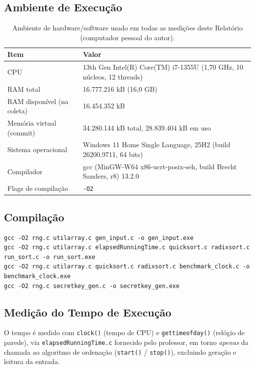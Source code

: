 \documentclass[11pt,a4paper]{article}
\renewcommand{\_}{\underscoreoriginal\allowbreak}
\begin{document}
\subsection{Ambiente de Execução}
\label{sec:ambiente}

\begin{table}[H]
\centering
\caption{Ambiente de hardware/software usado em todas as medições deste Relatório (computador pessoal do autor).}
{\small
\begin{tabular}{L{4.0cm} L{10.5cm}}
\toprule
{}
Item & Valor\\
\midrule
CPU & 13th Gen Intel(R) Core(TM) i7-1355U (1,70 GHz, 10 núcleos, 12 threads)\\
RAM total & 16.777.216 kB (16,0 GB)\\
RAM disponível (na coleta) & 16.454.352 kB\\
Memória virtual (commit) & 34.280.144 kB total, 28.839.404 kB em uso\\
Sistema operacional & Windows 11 Home Single Language, 25H2 (build 26200.9711, 64 bits)\\
Compilador & gcc (MinGW-W64 x86\_64-ucrt-posix-seh, build Brecht Sanders, r8) 13.2.0\\
Flags de compilação & \texttt{-O2}\\
\bottomrule
\end{tabular}
}
\end{table}

\subsection{Compilação}

\begin{lstlisting}
gcc -O2 rng.c utilarray.c gen_input.c -o gen_input.exe
gcc -O2 rng.c utilarray.c elapsedRunningTime.c quicksort.c radixsort.c run_sort.c -o run_sort.exe
gcc -O2 rng.c utilarray.c quicksort.c radixsort.c benchmark_clock.c -o benchmark_clock.exe
gcc -O2 rng.c secretkey_gen.c -o secretkey_gen.exe
\end{lstlisting}

\subsection{Medição do Tempo de Execução}
\label{sec:medicao}

O tempo é medido com \texttt{clock()} (tempo de CPU) e
\texttt{gettimeofday()} (relógio de parede), via
\texttt{elapsedRunningTime.c} fornecido pelo professor, em torno
\emph{apenas} da chamada ao algoritmo de ordenação (\texttt{start()} /
\texttt{stop()}), excluindo geração e leitura da entrada.
\end{document}
